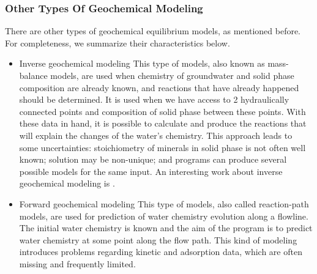 \subsubsection{Other Types Of Geochemical Modeling}
There are other types of geochemical equilibrium models, as mentioned before. For completeness, we summarize their characteristics below. 
\begin{itemize}
\item Inverse geochemical modeling
This type of models, also known as mass-balance models, are used when chemistry of groundwater and solid phase composition are already known, and reactions that have already happened should be determined. It is used when we have access to 2 hydraulically connected points and composition of solid phase between these points. With these data in hand, it is possible to calculate and produce the reactions that will explain the changes of the water's chemistry. This approach leads to some uncertainties: stoichiometry of minerals in solid phase is not often well known; solution may be non-unique; and programs can produce several possible models for the same input. An interesting work about inverse geochemical modeling is \cite{Sharif:07}.

\item Forward geochemical modeling
This type of models, also called reaction-path models, are used for prediction of water chemistry evolution along a flowline. The initial water chemistry is known and the aim of the program is to predict water chemistry at some point along the flow path. This kind of modeling introduces problems regarding kinetic and adsorption data, which are often missing and frequently limited.
\end{itemize}

\newpage

